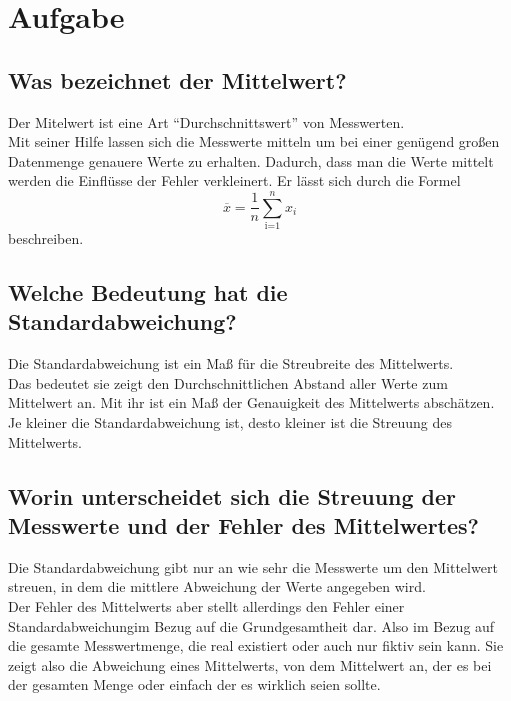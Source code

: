 




\section{Aufgabe }
\subsection{Was bezeichnet der Mittelwert?}
Der Mitelwert ist eine Art \enquote{Durchschnittswert} von Messwerten.\\
Mit seiner Hilfe lassen sich die Messwerte mitteln um bei einer genügend großen Datenmenge genauere Werte zu erhalten.
Dadurch, dass man die Werte mittelt werden die Einflüsse der Fehler verkleinert.
Er lässt sich durch die Formel
\begin{equation*}
    \overline{x}=\frac{1}{n}\sum_{\text{i=1}}^n x_i
\end{equation*}
beschreiben.

\subsection{Welche Bedeutung hat die Standardabweichung?}
Die Standardabweichung ist ein Maß für die Streubreite des Mittelwerts.\\
Das bedeutet sie zeigt den Durchschnittlichen Abstand aller Werte zum Mittelwert an. Mit ihr ist ein Maß der Genauigkeit des Mittelwerts abschätzen.
Je kleiner die Standardabweichung ist, desto kleiner ist die Streuung des Mittelwerts.

\subsection{Worin unterscheidet sich die Streuung der Messwerte und der Fehler des Mittelwertes?}
Die Standardabweichung gibt nur an wie sehr die Messwerte um den Mittelwert streuen, in dem die mittlere Abweichung der Werte angegeben wird.\\
Der Fehler des Mittelwerts aber stellt allerdings den Fehler einer Standardabweichungim Bezug auf die Grundgesamtheit dar. Also im Bezug auf die gesamte Messwertmenge, 
die real existiert oder auch nur fiktiv sein kann. Sie zeigt also die Abweichung eines Mittelwerts, von dem Mittelwert an, der es bei der gesamten Menge oder einfach der es wirklich seien sollte.

